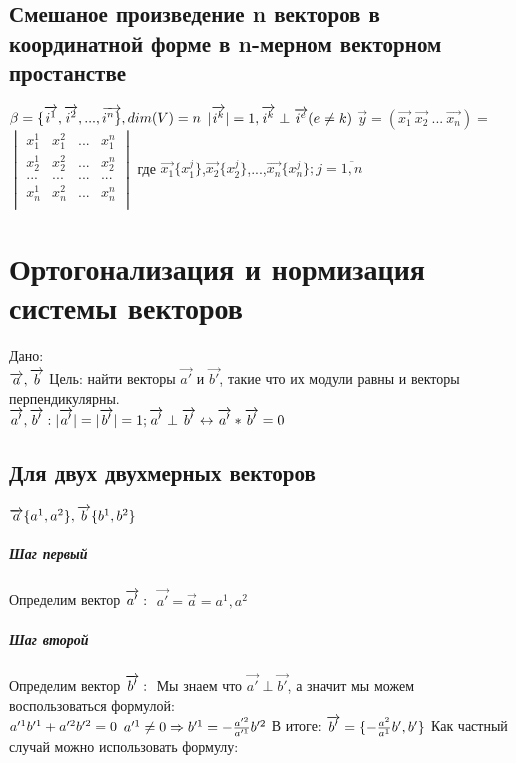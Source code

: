 \documentclass{book}
\begin{document}
\section{Смешаное произведение n векторов в координатной форме в n-мерном векторном простанстве}
$\beta=\{\overrightarrow{i^1},\overrightarrow{i^2},...,\overrightarrow{i^n\}}, dim(V)=n\\$
$|\overrightarrow{i^k}|=1, \overrightarrow{i^k} \perp \overrightarrow{i^e} (e \neq k)\\$
$\overrightarrow{y}=(\overrightarrow{x_1}\ \overrightarrow{x_2}\ ...\ \overrightarrow{x_{n}})=$
$\begin{vmatrix}
    x_1^1 & x_1^2 & ... & x_1^n\\
    x_2^1 & x_2^2 & ... & x_2^n\\
    ... & ... & ... & ...\\
    x_{n}^1 & x_{n}^2 & ... & x_{n}^n\\
\end{vmatrix}$ где $\overrightarrow{x_1}\{x^j_1\}$,$\overrightarrow{x_2}\{x^j_2\}$,...,$\overrightarrow{x_{n}}\{x^j_{n}\}; j=\overline{1,n}$
\newpage
\chapter{Ортогонализация и нормизация системы векторов}
Дано:\\
$\overrightarrow{a},\overrightarrow{b}\\$
Цель: найти векторы $\overrightarrow{a'}$ и $\overrightarrow{b'}$, такие что их модули равны и векторы перпендикулярны.\\
$\overrightarrow{a'},\overrightarrow{b'} : |\overrightarrow{a'}|=|\overrightarrow{b'}|=1;\overrightarrow{a'}\perp\overrightarrow{b'} \leftrightarrow \overrightarrow{a'}*\overrightarrow{b'}=0\\$
\section{Для двух двухмерных векторов}
$\overrightarrow{a}\{a^1,a^2\}, \overrightarrow{b}\{b^1,b^2\}\\$
\paragraph*{Шаг первый}
Определим вектор $\overrightarrow{a'}:\\$
$\overrightarrow{a'}=\overrightarrow{a}={a^1,a^2}$
\paragraph*{Шаг второй}
Определим вектор $\overrightarrow{b'}:\\$
Мы знаем что $\overrightarrow{a'}\perp\overrightarrow{b'}$, а значит мы можем воспользоваться формулой:\\
$a'^1b'^1+a'^2b'^2=0\\$
$a'^1\neq0 \Rightarrow b'^1=-\frac{a'^2}{a'^1}b'^2\\$
В итоге: $\overrightarrow{b'}=\{-\frac{a^2}{a^1}b',b'\}\\$
Как частный случай можно использовать формулу:
\end{document}
